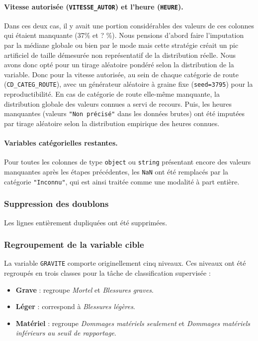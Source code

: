\documentclass[11pt]{article}
\begin{document}
\paragraph{Vitesse autorisée (\texttt{VITESSE\_AUTOR}) et l'heure (\texttt{HEURE}).}
Dans ces deux cas, il y avait une portion considérables des valeurs de ces colonnes qui étaient manquante (37\% et ? \%). Nous pensions d'abord faire l'imputation par la médiane globale ou bien par le mode mais cette stratégie créait un pic artificiel de taille démesurée
non représentatif de la distribution réelle. Nous avons donc opté
pour un tirage aléatoire pondéré selon la distribution de la variable. Donc pour la vitesse autorisée, 
au sein de chaque catégorie de route (\texttt{CD\_CATEG\_ROUTE}),
avec un générateur aléatoire à graine fixe (\texttt{seed=3795}) pour
la reproductibilité. En cas de catégorie de route elle-même manquante,
la distribution globale des valeurs connues a servi de recours.
Puis, les heures manquantes (valeurs \texttt{"Non précisé"}
dans les données brutes) ont été imputées par tirage aléatoire selon la
distribution empirique des heures connues.
 
\paragraph{Variables catégorielles restantes.}
Pour toutes les colonnes de type \texttt{object} ou \texttt{string}
présentant encore des valeurs manquantes après les étapes précédentes,
les \texttt{NaN} ont été remplacés par la catégorie \texttt{"Inconnu"},
qui est ainsi traitée comme une modalité à part entière.
 
\subsubsection{Suppression des doublons}
 
Les lignes entièrement dupliquées ont été supprimées.
 
\subsubsection{Regroupement de la variable cible}
 
La variable \texttt{GRAVITE} comporte originellement cinq niveaux.
Ces niveaux ont été regroupés en trois classes pour la tâche de
classification supervisée :
 
\begin{itemize}
  \item \textbf{Grave} : regroupe \emph{Mortel} et
        \emph{Blessures graves}.
  \item \textbf{Léger} : correspond à \emph{Blessures légères}.
  \item \textbf{Matériel} : regroupe \emph{Dommages matériels seulement}
        et \emph{Dommages matériels inférieurs au seuil de rapportage}.
\end{itemize}
 
\end{document}
